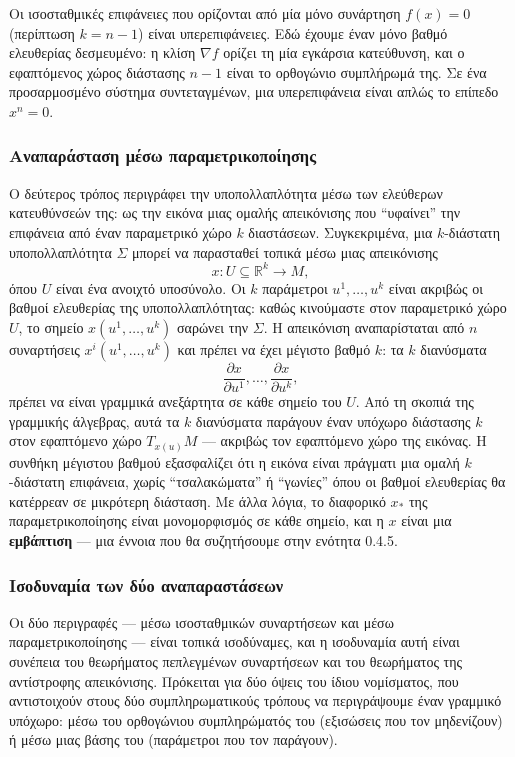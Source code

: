 \documentclass[12pt]{article}
\begin{document}
Οι ισοσταθμικές επιφάνειες που ορίζονται από μία μόνο συνάρτηση $f(x) = 0$ (περίπτωση $k = n-1$) είναι υπερεπιφάνειες. Εδώ έχουμε έναν μόνο βαθμό ελευθερίας δεσμευμένο: η κλίση $\nabla f$ ορίζει τη μία εγκάρσια κατεύθυνση, και ο εφαπτόμενος χώρος διάστασης $n-1$ είναι το ορθογώνιο συμπλήρωμά της. Σε ένα προσαρμοσμένο σύστημα συντεταγμένων, μια υπερεπιφάνεια είναι απλώς το επίπεδο $x^n = 0$.

\subsubsection{Αναπαράσταση μέσω παραμετρικοποίησης}

Ο δεύτερος τρόπος περιγράφει την υποπολλαπλότητα μέσω των ελεύθερων κατευθύνσεών της: ως την εικόνα μιας ομαλής απεικόνισης που ``υφαίνει'' την επιφάνεια από έναν παραμετρικό χώρο $k$ διαστάσεων. Συγκεκριμένα, μια $k$-διάστατη υποπολλαπλότητα $\Sigma$ μπορεί να παρασταθεί τοπικά μέσω μιας απεικόνισης
\[
x: U \subseteq \mathbb{R}^k \to M,
\]
όπου $U$ είναι ένα ανοιχτό υποσύνολο. Οι $k$ παράμετροι $u^1, \dots, u^k$ είναι ακριβώς οι βαθμοί ελευθερίας της υποπολλαπλότητας: καθώς κινούμαστε στον παραμετρικό χώρο $U$, το σημείο $x(u^1, \dots, u^k)$ σαρώνει την $\Sigma$. Η απεικόνιση αναπαρίσταται από $n$ συναρτήσεις $x^i(u^1, \dots, u^k)$ και πρέπει να έχει μέγιστο βαθμό $k$: τα $k$ διανύσματα
\[
\frac{\partial x}{\partial u^1}, \dots, \frac{\partial x}{\partial u^k},
\]
πρέπει να είναι γραμμικά ανεξάρτητα σε κάθε σημείο του $U$. Από τη σκοπιά της γραμμικής άλγεβρας, αυτά τα $k$ διανύσματα παράγουν έναν υπόχωρο διάστασης $k$ στον εφαπτόμενο χώρο $T_{x(u)}M$ --- ακριβώς τον εφαπτόμενο χώρο της εικόνας. Η συνθήκη μέγιστου βαθμού εξασφαλίζει ότι η εικόνα είναι πράγματι μια ομαλή $k$-διάστατη επιφάνεια, χωρίς ``τσαλακώματα'' ή ``γωνίες'' όπου οι βαθμοί ελευθερίας θα κατέρρεαν σε μικρότερη διάσταση. Με άλλα λόγια, το διαφορικό $x_*$ της παραμετρικοποίησης είναι μονομορφισμός σε κάθε σημείο, και η $x$ είναι μια \textbf{εμβάπτιση} --- μια έννοια που θα συζητήσουμε στην ενότητα 0.4.5.

\subsubsection{Ισοδυναμία των δύο αναπαραστάσεων}

Οι δύο περιγραφές --- μέσω ισοσταθμικών συναρτήσεων και μέσω παραμετρικοποίησης --- είναι τοπικά ισοδύναμες, και η ισοδυναμία αυτή είναι συνέπεια του θεωρήματος πεπλεγμένων συναρτήσεων και του θεωρήματος της αντίστροφης απεικόνισης. Πρόκειται για δύο όψεις του ίδιου νομίσματος, που αντιστοιχούν στους δύο συμπληρωματικούς τρόπους να περιγράψουμε έναν γραμμικό υπόχωρο: μέσω του ορθογώνιου συμπληρώματός του (εξισώσεις που τον μηδενίζουν) ή μέσω μιας βάσης του (παράμετροι που τον παράγουν).
\end{document}
